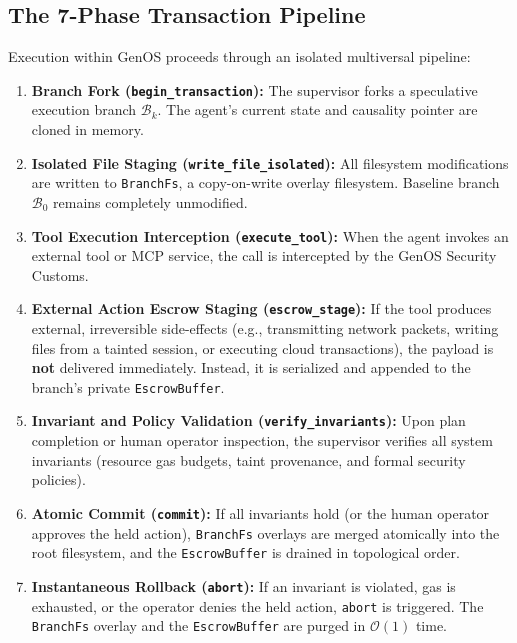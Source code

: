 \documentclass[10pt,journal,compsoc]{IEEEtran}
\theoremstyle{definition}
\begin{document}
\subsection{The 7-Phase Transaction Pipeline}
Execution within GenOS proceeds through an isolated multiversal pipeline:
\begin{enumerate}
    \item \textbf{Branch Fork (\texttt{begin\_transaction}):} The supervisor forks a speculative execution branch $\mathcal{B}_k$. The agent's current state and causality pointer are cloned in memory.
    \item \textbf{Isolated File Staging (\texttt{write\_file\_isolated}):} All filesystem modifications are written to \texttt{BranchFs}, a copy-on-write overlay filesystem. Baseline branch $\mathcal{B}_0$ remains completely unmodified.
    \item \textbf{Tool Execution Interception (\texttt{execute\_tool}):} When the agent invokes an external tool or MCP service, the call is intercepted by the GenOS Security Customs.
    \item \textbf{External Action Escrow Staging (\texttt{escrow\_stage}):} If the tool produces external, irreversible side-effects (e.g., transmitting network packets, writing files from a tainted session, or executing cloud transactions), the payload is \textbf{not} delivered immediately. Instead, it is serialized and appended to the branch's private \texttt{EscrowBuffer}.
    \item \textbf{Invariant and Policy Validation (\texttt{verify\_invariants}):} Upon plan completion or human operator inspection, the supervisor verifies all system invariants (resource gas budgets, taint provenance, and formal security policies).
    \item \textbf{Atomic Commit (\texttt{commit}):} If all invariants hold (or the human operator approves the held action), \texttt{BranchFs} overlays are merged atomically into the root filesystem, and the \texttt{EscrowBuffer} is drained in topological order.
    \item \textbf{Instantaneous Rollback (\texttt{abort}):} If an invariant is violated, gas is exhausted, or the operator denies the held action, \texttt{abort} is triggered. The \texttt{BranchFs} overlay and the \texttt{EscrowBuffer} are purged in $\mathcal{O}(1)$ time.
\end{enumerate}
\end{document}
